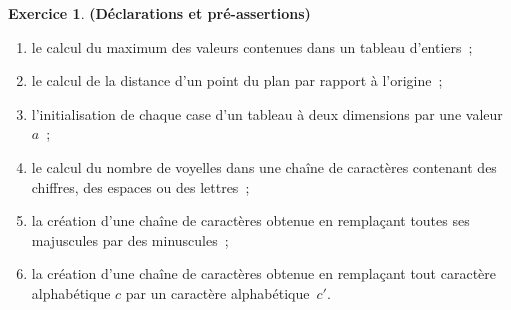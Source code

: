 \documentclass[12pt]{article}
\theoremstyle{definition}
\newtheorem{Exercice}{Exercice}
\begin{document}
\begin{Exercice} {\bf (Déclarations et pré-assertions)}
\begin{enumerate}
    \item le calcul du maximum des valeurs contenues dans un tableau 
    d'entiers~;
    \smallskip
    
    \item le calcul de la distance d'un point du plan par rapport à 
    l'origine~;
    \smallskip
    
    \item l'initialisation de chaque case d'un tableau à deux dimensions 
    par une valeur $a$~;
    \smallskip
    
    \item le calcul du nombre de voyelles dans une chaîne de caractères 
    contenant des chiffres, des espaces ou des lettres~;
    \smallskip
    
    \item la création d'une chaîne de caractères obtenue en remplaçant
    toutes ses majuscules par des minuscules~;
    \smallskip
    
    \item la création d'une chaîne de caractères obtenue en remplaçant 
    tout caractère alphabétique $c$ par un caractère alphabétique~$c'$.
\end{enumerate}
\end{Exercice}
\bigskip
\end{document}
